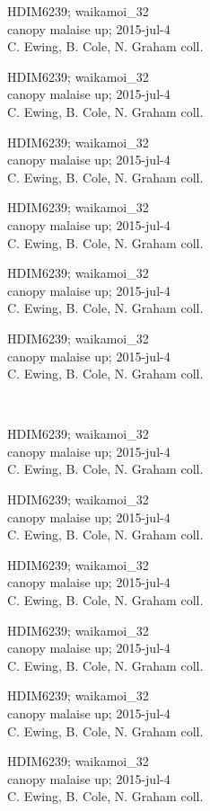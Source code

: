 \documentclass[2pt]{extarticle}
\begin{document}
\noindent
\parbox{0.16\textwidth}{\tiny \raggedright \rule[-0.3\baselineskip]{0pt}{10pt}HDIM6239; waikamoi\_32\\ canopy malaise up; 2015-jul-4\\ C. Ewing, B. Cole, N. Graham coll.}
\parbox{0.16\textwidth}{\tiny \raggedright \rule[-0.3\baselineskip]{0pt}{10pt}HDIM6239; waikamoi\_32\\ canopy malaise up; 2015-jul-4\\ C. Ewing, B. Cole, N. Graham coll.}
\parbox{0.16\textwidth}{\tiny \raggedright \rule[-0.3\baselineskip]{0pt}{10pt}HDIM6239; waikamoi\_32\\ canopy malaise up; 2015-jul-4\\ C. Ewing, B. Cole, N. Graham coll.}
\parbox{0.16\textwidth}{\tiny \raggedright \rule[-0.3\baselineskip]{0pt}{10pt}HDIM6239; waikamoi\_32\\ canopy malaise up; 2015-jul-4\\ C. Ewing, B. Cole, N. Graham coll.}
\parbox{0.16\textwidth}{\tiny \raggedright \rule[-0.3\baselineskip]{0pt}{10pt}HDIM6239; waikamoi\_32\\ canopy malaise up; 2015-jul-4\\ C. Ewing, B. Cole, N. Graham coll.}
\parbox{0.16\textwidth}{\tiny \raggedright \rule[-0.3\baselineskip]{0pt}{10pt}HDIM6239; waikamoi\_32\\ canopy malaise up; 2015-jul-4\\ C. Ewing, B. Cole, N. Graham coll.} \\ 
\vspace{0.001in} 

\noindent
\parbox{0.16\textwidth}{\tiny \raggedright \rule[-0.3\baselineskip]{0pt}{10pt}HDIM6239; waikamoi\_32\\ canopy malaise up; 2015-jul-4\\ C. Ewing, B. Cole, N. Graham coll.}
\parbox{0.16\textwidth}{\tiny \raggedright \rule[-0.3\baselineskip]{0pt}{10pt}HDIM6239; waikamoi\_32\\ canopy malaise up; 2015-jul-4\\ C. Ewing, B. Cole, N. Graham coll.}
\parbox{0.16\textwidth}{\tiny \raggedright \rule[-0.3\baselineskip]{0pt}{10pt}HDIM6239; waikamoi\_32\\ canopy malaise up; 2015-jul-4\\ C. Ewing, B. Cole, N. Graham coll.}
\parbox{0.16\textwidth}{\tiny \raggedright \rule[-0.3\baselineskip]{0pt}{10pt}HDIM6239; waikamoi\_32\\ canopy malaise up; 2015-jul-4\\ C. Ewing, B. Cole, N. Graham coll.}
\parbox{0.16\textwidth}{\tiny \raggedright \rule[-0.3\baselineskip]{0pt}{10pt}HDIM6239; waikamoi\_32\\ canopy malaise up; 2015-jul-4\\ C. Ewing, B. Cole, N. Graham coll.}
\parbox{0.16\textwidth}{\tiny \raggedright \rule[-0.3\baselineskip]{0pt}{10pt}HDIM6239; waikamoi\_32\\ canopy malaise up; 2015-jul-4\\ C. Ewing, B. Cole, N. Graham coll.} \\ 
\vspace{0.001in} 
\end{document}
